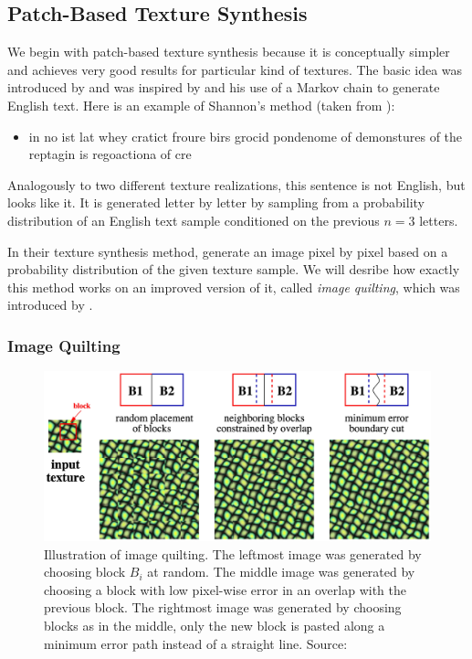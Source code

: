 \subsection{Patch-Based Texture Synthesis}
\label{section:background-texture_synthesis-patch_based}

We begin with patch-based texture synthesis because it is conceptually simpler and achieves very good results for particular kind of textures. The basic idea was introduced by \citet{Efros1999} and was inspired by \citet{Shannon1948} and his use of a Markov chain to generate English text. Here is an example of Shannon's method (taken from \citet{Raad2018}):

\begin{itemize}
    \item in no ist lat whey cratict froure birs grocid pondenome of demonstures of the reptagin is regoactiona of cre
\end{itemize}

Analogously to two different texture realizations, this sentence is not English, but looks like it. It is generated letter by letter by sampling from a probability distribution of an English text sample conditioned on the previous \(n = 3\) letters.

In their texture synthesis method, \citet{Efros1999} generate an image pixel by pixel based on a probability distribution of the given texture sample. We will desribe how exactly this method works on an improved version of it, called \textit{image quilting}, which was introduced by \citet{Efros2001}.

\subsubsection{Image Quilting}
\label{section:background-texture_synthesis-patch_based-quilting}

\begin{figure}[ht]
    \centering
    \includegraphics[width=\textwidth]{images/02-quilting_method_compressed.jpg}
    \caption{Illustration of image quilting. The leftmost image was generated by choosing block \(B_i\) at random. The middle image was generated by choosing a block with low pixel-wise error in an overlap with the previous block. The rightmost image was generated by choosing blocks as in the middle, only the new block is pasted along a minimum error path instead of a straight line.  Source: \citet{Efros2001}}
    \label{fig:background_quilting_method}
\end{figure}


